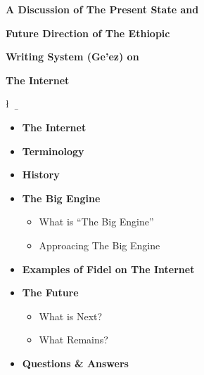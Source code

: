 
\centerline{\LARGE\bf A Discussion of The Present State and}
\centerline{\LARGE\bf Future Direction of The Ethiopic}
\centerline{\LARGE\bf Writing System (Ge'ez) on}
\centerline{\LARGE\bf The Internet} 
\vspace{0.1in}
\centerline{\da\n\E\l \ \ya\II\qo\b \ \me\kWe\n\n} 
\vspace{0.05in}
\centerline{}

\vspace{0.4in}

\begin{itemize}
  \item {\large\bf The Internet}
  \item {\large\bf Terminology}
  \item {\large\bf History}
  \item {\large\bf The Big Engine}
    \begin{itemize}
      \item What is ``The Big Engine''
      \item Approacing The Big Engine
    \end{itemize}
  \item {\large\bf Examples of Fidel on The Internet}
  \item {\large\bf The Future}
    \begin{itemize}
      \item What is Next?
      \item What Remains?
    \end{itemize}
  \item {\large\bf Questions \& Answers}
\end{itemize}
